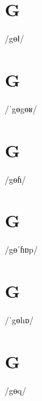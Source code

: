 \documentclass[10pt,a4paper,twoside]{book}
\begin{document}
\section*{G}

\begin{multicols}{3}
 {/gɵǁ/} {}
\end{multicols}

\section*{G}

\begin{multicols}{3}
 {/ˈgɵgɵʁ/} {}
\end{multicols}

\section*{G}

\begin{multicols}{3}
 {/gɵɦ/} {}
\end{multicols}

\section*{G}

\begin{multicols}{3}
 {/gɵˈɦɒp/} {}
\end{multicols}

\section*{G}

\begin{multicols}{3}
 {/ˈgɵhɒ/} {}
\end{multicols}

\section*{G}

\begin{multicols}{3}
 {/gɵq/} {}
\end{multicols}
\end{document}
